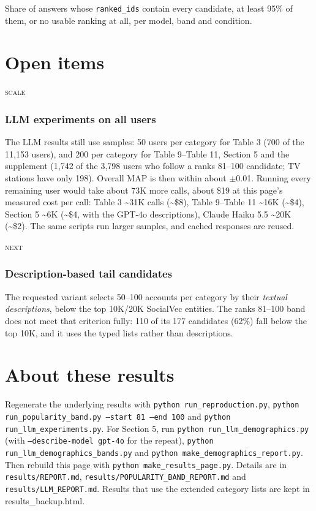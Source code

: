 \documentclass[10pt]{article}
\begin{document}
{\small Share of answers whose \texttt{ranked\_ids} contain every candidate, at least 95\% of them, or no usable ranking at all, per model, band and condition.}

\section{Open items}
\noindent\textsc{scale}\par
\subsubsection*{LLM experiments on all users}
The LLM results still use samples: 50 users per category for Table 3 (700 of the 11,153 users), and 200 per category for Table 9--Table 11, Section 5 and the supplement (1,742 of the 3,798 users who follow a ranks 81--100 candidate; TV stations have only 198). Overall MAP is then within about $\pm$0.01. Running every remaining user would take about 73K more calls, about \$19 at this page's measured cost per call: Table 3 \textasciitilde{}31K calls (\textasciitilde{}\$8), Table 9--Table 11 \textasciitilde{}16K (\textasciitilde{}\$4), Section 5 \textasciitilde{}6K (\textasciitilde{}\$4, with the GPT-4o descriptions), Claude Haiku 5.5 \textasciitilde{}20K (\textasciitilde{}\$2). The same scripts run larger samples, and cached responses are reused.

\noindent\textsc{next}\par
\subsubsection*{Description-based tail candidates}
The requested variant selects 50--100 accounts per category by their \emph{textual descriptions}, below the top 10K/20K SocialVec entities. The ranks 81--100 band does not meet that criterion fully: 110 of its 177 candidates (62\%) fall below the top 10K, and it uses the typed lists rather than descriptions.

\section*{About these results}
Regenerate the underlying results with \texttt{python run\_reproduction.py}, \texttt{python run\_popularity\_band.py --start 81 --end 100} and \texttt{python run\_llm\_experiments.py}. For Section 5, run \texttt{python run\_llm\_demographics.py} (with \texttt{--describe-model gpt-4o} for the repeat), \texttt{python run\_llm\_demographics\_bands.py} and \texttt{python make\_demographics\_report.py}. Then rebuild this page with \texttt{python make\_results\_page.py}. Details are in \texttt{results/REPORT.md}, \texttt{results/POPULARITY\_BAND\_REPORT.md} and \texttt{results/LLM\_REPORT.md}. Results that use the extended category lists are kept in results\_backup.html.
\end{document}

